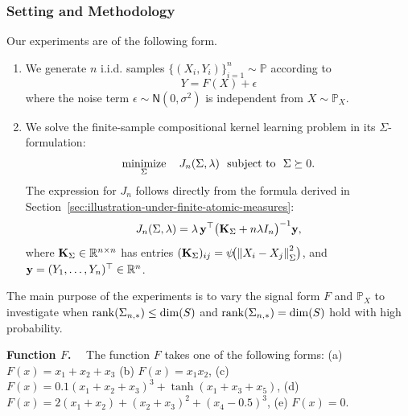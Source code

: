 \documentclass[sn-mathphys-num]{sn-jnl}%
\numberwithin{equation}{section}
\newcommand{\R}{\mathbb{R}}
\renewcommand{\H}{\mathcal{H}}
\newcommand{\norm}[1]{\left\|{#1}\right\|} %
\providecommand{\minimize}{\mathop{\rm minimize}}
\newcommand{\normal}{\mathsf{N}}  %
\renewcommand{\P}{\mathbb{P}}
\renewcommand{\H}{\mathbb{H}}
\renewcommand{\H}{\mathcal{H}}
\newcommand{\rank}{{\rm rank}}
\providecommand{\minimize}{\mathop{\rm minimize}}
\theoremstyle{thmstyleone}%
\theoremstyle{thmstyletwo}%
\theoremstyle{thmstylethree}%
\begin{document}
\vspace{-.25em} 
\subsubsection{Setting and Methodology} 
\label{sec:setting-and-methodology}
Our experiments are of the following form. 

\begin{enumerate}
\item We generate $n$  i.i.d. samples $\{(X_i, Y_i)\}_{i=1}^n \sim \P$ according to 
	\begin{equation*}
		Y = F(X) + \epsilon
	\end{equation*}
	where the noise term $\epsilon \sim \normal(0, \sigma^2)$ is independent from $X \sim \P_X$. 
\item We solve the finite-sample compositional kernel learning problem in its
$\Sigma$-formulation:
	\begin{equation}
	\label{eqn:general-kernel-learning-objective}
		\minimize_{\Sigma}~~~J_n(\Sigma, \lambda)
			~~\subjectto~~\Sigma \succeq 0.
	\end{equation} 
	The expression for $J_n$ follows directly from the formula derived in Section~\ref{sec:illustration-under-finite-atomic-measures}: 
\begin{equation*}	
	J_n(\Sigma, \lambda) =
	\lambda\,
	\mathbf{y}^\top
	\bigl(\mathbf{K}_\Sigma + n\lambda I_n\bigr)^{-1}
	\mathbf{y},
\end{equation*}
where $\K_\Sigma  \in \R^{n\times n}$ has entries $(\K_\Sigma)_{ij} = \psi\!\bigl(\norm{X_i-X_j}_\Sigma^2\bigr)$,
and $\y = (Y_1,\ldots,Y_n)^\top \in \R^n$.	
\end{enumerate}

\vspace{.5em} 
The main purpose of the experiments is to vary the signal form $F$ and $\P_X$ %
to investigate when $\rank(\Sigma_{n, *}) \le \dim(S)$ and 
$\rank(\Sigma_{n, *}) = \dim(S)$ hold with 
high probability.

\vspace{.3cm}
\noindent\noindent
\textbf{Function $F$.}~~
The function $F$ takes one of the following forms: (a) $F(x) = x_1 + x_2 + x_3$ (b) $F(x) = x_1 x_2$, 
(c) $F(x) = 0.1(x_1 + x_2 + x_3)^3 + \tanh(x_1 + x_3 + x_5)$, (d) $F(x)= 2(x_1 + x_2) + (x_2 + x_3)^2 + (x_4 - 0.5)^3$, 
(e) $F(x) = 0$.
\end{document}

